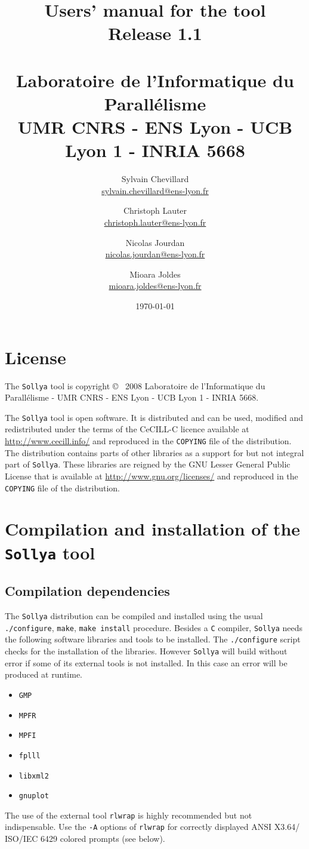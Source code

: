 \documentclass[a4paper]{article}
\title{Users' manual for the \sollya tool \\ {\large Release 1.1} \\ ~ \\ {\large Laboratoire de l'Informatique du Parall\'elisme \\ UMR CNRS - ENS Lyon - UCB Lyon 1 - INRIA 5668}}
\author{Sylvain Chevillard \\ \small{\url{sylvain.chevillard@ens-lyon.fr}} \and Christoph Lauter \\ \small{\url{christoph.lauter@ens-lyon.fr}} \and Nicolas Jourdan \\ \small{\url{nicolas.jourdan@ens-lyon.fr}} \and Mioara Joldes \\ \small{\url{mioara.joldes@ens-lyon.fr}} }
\date{\today}
\newcommand{\sollya}{\texttt{Sollya}\xspace}
\begin{document}
\maketitle

\section*{License}

The \sollya tool is copyright \copyright~ 2008 Laboratoire de
l'Informatique du Parall\'elisme - UMR CNRS - ENS Lyon - UCB Lyon 1 -
INRIA 5668.  

The \sollya tool is open software. It is distributed and can be used,
modified and redistributed under the terms of the CeCILL-C licence
available at \url{http://www.cecill.info/} and reproduced in the
\texttt{COPYING} file of the distribution. The distribution contains
parts of other libraries as a support for but not integral part of
\sollya. These libraries are reigned by the GNU Lesser General Public
License that is available at \url{http://www.gnu.org/licenses/} and
reproduced in the \texttt{COPYING} file of the distribution.

\tableofcontents

\section{Compilation and installation of the \sollya tool}

\subsection{Compilation dependencies}

The \sollya distribution can be compiled and installed using the usual
\texttt{./configure}, \texttt{make}, \texttt{make install}
procedure. Besides a \texttt{C} compiler, \sollya needs the following
software libraries and tools to be installed. The \texttt{./configure}
script checks for the installation of the libraries. However \sollya
will build without error if some of its external tools is not
installed. In this case an error will be produced at runtime.
\begin{itemize}
\item \texttt{GMP}
\item \texttt{MPFR}
\item \texttt{MPFI}
\item \texttt{fplll}
\item \texttt{libxml2}
\item \texttt{gnuplot}
\end{itemize}
The use of the external tool \texttt{rlwrap} is highly recommended but
not indispensable. Use the \texttt{-A} options of \texttt{rlwrap} for
correctly displayed ANSI X3.64/ ISO/IEC 6429 colored prompts (see
below).
\end{document}
